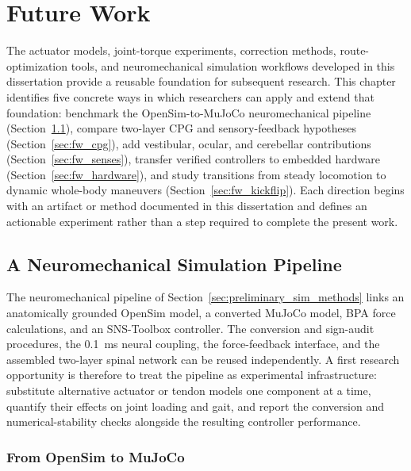 \chapter{Future Work}\label{ch:futurework}
\graphicspath{{figs/FutureWork/}}

The actuator models, joint-torque experiments, correction methods, route-optimization tools, and neuromechanical simulation workflows developed in this dissertation provide a reusable foundation for subsequent research. This chapter identifies five concrete ways in which researchers can apply and extend that foundation: benchmark the OpenSim-to-MuJoCo neuromechanical pipeline (Section~\ref{sec:fw_pipeline}), compare two-layer CPG and sensory-feedback hypotheses (Section~\ref{sec:fw_cpg}), add vestibular, ocular, and cerebellar contributions (Section~\ref{sec:fw_senses}), transfer verified controllers to embedded hardware (Section~\ref{sec:fw_hardware}), and study transitions from steady locomotion to dynamic whole-body maneuvers (Section~\ref{sec:fw_kickflip}). Each direction begins with an artifact or method documented in this dissertation and defines an actionable experiment rather than a step required to complete the present work.

\section{A Neuromechanical Simulation Pipeline}\label{sec:fw_pipeline}

The neuromechanical pipeline of Section~\ref{sec:preliminary_sim_methods} links an anatomically grounded OpenSim model, a converted MuJoCo model, BPA force calculations, and an SNS-Toolbox controller. The conversion and sign-audit procedures, the \qty{0.1}{\milli\second} neural coupling, the force-feedback interface, and the assembled two-layer spinal network can be reused independently. A first research opportunity is therefore to treat the pipeline as experimental infrastructure: substitute alternative actuator or tendon models one component at a time, quantify their effects on joint loading and gait, and report the conversion and numerical-stability checks alongside the resulting controller performance.

\subsection{From OpenSim to MuJoCo}

